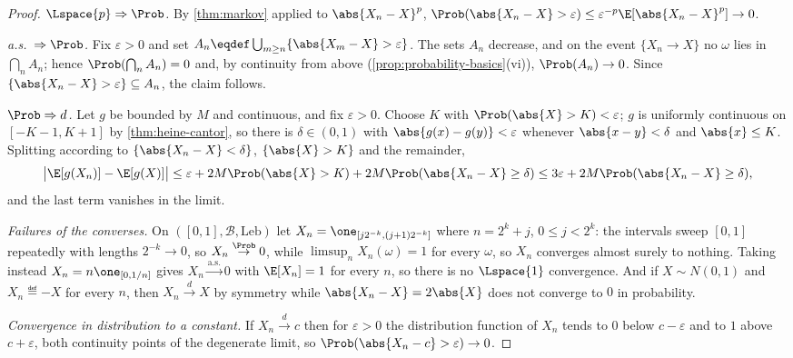 \begin{proof}
	\emph{$\Lspace{p}\Rightarrow\Prob$.} By \autoref{thm:markov} applied to
	$\abs{X_n-X}^{p}$,
	$\Prob(\abs{X_n-X}>\varepsilon)\leq\varepsilon^{-p}\E[\abs{X_n-X}^{p}]\to0$.

	\emph{a.s.\ $\Rightarrow\Prob$.} Fix $\varepsilon>0$ and set
	$A_n\eqdef\bigcup_{m\geq n}\{\abs{X_m-X}>\varepsilon\}$. The sets $A_n$
	decrease, and on the event $\{X_n\to X\}$ no $\omega$ lies in
	$\bigcap_nA_n$; hence $\Prob(\bigcap_nA_n)=0$ and, by continuity from above
	(\autoref{prop:probability-basics}(vi)), $\Prob(A_n)\to0$. Since
	$\{\abs{X_n-X}>\varepsilon\}\subseteq A_n$, the claim follows.

	\emph{$\Prob\Rightarrow d$.} Let $g$ be bounded by $M$ and continuous, and fix
	$\varepsilon>0$. Choose $K$ with $\Prob(\abs{X}>K)<\varepsilon$; $g$ is
	uniformly continuous on $[-K-1,K+1]$ by \autoref{thm:heine-cantor}, so there is
	$\delta\in(0,1)$ with $\abs{g(x)-g(y)}<\varepsilon$ whenever
	$\abs{x-y}<\delta$ and $\abs{x}\leq K$. Splitting according to
	$\{\abs{X_n-X}<\delta\}$, $\{\abs{X}>K\}$ and the remainder,
	\[
		\bigl\lvert\E[g(X_n)]-\E[g(X)]\bigr\rvert
		\leq\varepsilon+2M\Prob(\abs{X}>K)+2M\Prob(\abs{X_n-X}\geq\delta)
		\leq3\varepsilon+2M\Prob(\abs{X_n-X}\geq\delta),
	\]
	and the last term vanishes in the limit.

	\emph{Failures of the converses.} On $([0,1],\mathcal{B},\text{Leb})$ let
	$X_n=\one_{[j2^{-k},(j+1)2^{-k}]}$ where $n=2^{k}+j$, $0\leq j<2^{k}$: the
	intervals sweep $[0,1]$ repeatedly with lengths $2^{-k}\to0$, so
	$X_n\overset{\Prob}{\to}0$, while $\limsup_nX_n(\omega)=1$ for every $\omega$,
	so $X_n$ converges almost surely to nothing. Taking instead
	$X_n=n\one_{[0,1/n]}$ gives $X_n\overset{\text{a.s.}}{\to}0$ with
	$\E[X_n]=1$ for every $n$, so there is no $\Lspace{1}$ convergence. And if
	$X\sim N(0,1)$ and $X_n\eqdef-X$ for every $n$, then
	$X_n\overset{d}{\to}X$ by symmetry while $\abs{X_n-X}=2\abs{X}$ does not
	converge to $0$ in probability.

	\emph{Convergence in distribution to a constant.} If $X_n\overset{d}{\to}c$
	then for $\varepsilon>0$ the distribution function of $X_n$ tends to $0$ below
	$c-\varepsilon$ and to $1$ above $c+\varepsilon$, both continuity points of the
	degenerate limit, so $\Prob(\abs{X_n-c}>\varepsilon)\to0$.
\end{proof}


